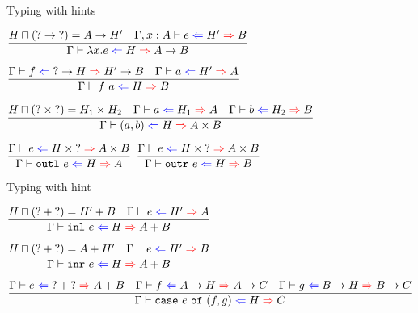 \documentclass{beamer}
\newcommand{\Fun}[2]{#1 \to #2}
\newcommand{\Prod}[2]{#1 \times #2}
\newcommand{\Sum}[2]{#1 + #2}
\newcommand{\fun}[2]{\lambda #1. #2}
\newcommand{\app}[2]{#1\ #2}
\newcommand{\pair}[2]{(#1, #2)}
\newcommand{\outl}[1][]{\texttt{outl}\ #1}
\newcommand{\outr}[1][]{\texttt{outr}\ #1}
\newcommand{\inl}[1][]{\texttt{inl}\ #1}
\newcommand{\inr}[1][]{\texttt{inr}\ #1}
\newcommand{\case}[3]{\texttt{case}\ #1\ \texttt{of}\ (#2, #3)}
\newcommand{\infrule}[3][]{\displaystyle \frac{#2}{#3} \textsc{\footnotesize{#1}}}
\newcommand{\extend}[3]{#1, #2 : #3}
\newcommand{\sidecond}[1]{#1}
\begin{document}
\begin{frame}{Typing with hints}

\begin{center}

  $\infrule{\sidecond{\combinehints{H}{(\Fun{\Hint}{\Hint})} = \Fun{A}{H'}} \quad \fullhinting{\extend{\Gamma}{x}{A}}{e}{H'}{B}}{\hinting{\fun{x}{e}}{H}{\Fun{A}{B}}}$

  \vspace{1em}

  $\infrule{\hinting{f}{\Fun{\Hint}{H}}{\Fun{H'}{B}} \quad \hinting{a}{H'}{A}}{\hinting{\app{f}{a}}{H}{B}}$

  \vspace{1em}

  $\infrule{\sidecond{\combinehints{H}{(\Prod{\Hint}{\Hint})} = \Prod{H_1}{H_2}} \quad \hinting{a}{H_1}{A} \quad \hinting{b}{H_2}{B}}{\hinting{\pair{a}{b}}{H}{\Prod{A}{B}}}$

  \vspace{1em}

  $\infrule{\hinting{e}{\Prod{H}{\Hint}}{\Prod{A}{B}}}{\hinting{\outl[e]}{H}{A}}$ \quad
  $\infrule{\hinting{e}{\Prod{H}{\Hint}}{\Prod{A}{B}}}{\hinting{\outr[e]}{H}{B}}$

\end{center}

\end{frame}

\begin{frame}{Typing with hint}

\begin{center}

$\infrule{\sidecond{\combinehints{H}{(\Sum{\Hint}{\Hint})} = \Sum{H'}{B}} \quad \hinting{e}{H'}{A}}{\hinting{\inl[e]}{H}{\Sum{A}{B}}}$

\vspace{2em}

$\infrule{\sidecond{\combinehints{H}{(\Sum{\Hint}{\Hint})} = \Sum{A}{H'}} \quad \hinting{e}{H'}{B}}{\hinting{\inr[e]}{H}{\Sum{A}{B}}}$

\vspace{2em}

$\infrule{\hinting{e}{\Sum{\Hint}{\Hint}}{\Sum{A}{B}} \quad \hinting{f}{\Fun{A}{H}}{\Fun{A}{C}} \quad \hinting{g}{\Fun{B}{H}}{\Fun{B}{C}}}{\hinting{\case{e}{f}{g}}{H}{C}}$

\end{center}

\end{frame}
\end{document}

